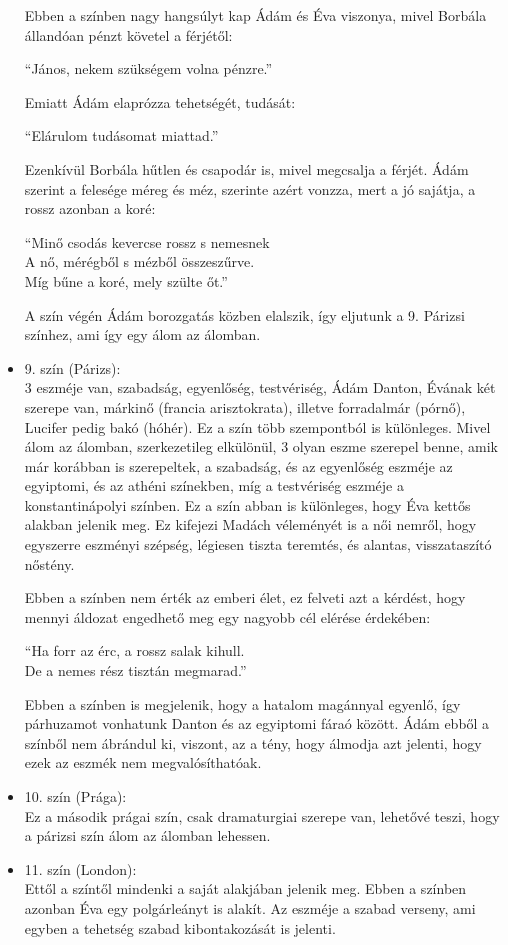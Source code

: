 \documentclass[]{article}
\begin{document}
\begin{itemize}
 			Ebben a színben nagy hangsúlyt kap Ádám és Éva viszonya, mivel Borbála állandóan pénzt követel a férjétől:
 			\begin{displayquote}
 				\enquote{János, nekem szükségem volna pénzre.}
 			\end{displayquote}
 			Emiatt Ádám elaprózza tehetségét, tudását:
 			\begin{displayquote}
 				\enquote{Elárulom tudásomat miattad.}
 			\end{displayquote}
 			Ezenkívül Borbála hűtlen és csapodár is, mivel megcsalja a férjét. Ádám szerint a felesége méreg és méz, szerinte azért vonzza, mert a jó sajátja, a rossz azonban a koré:
 			\begin{displayquote}
 				\enquote{Minő csodás kevercse rossz s nemesnek\\
 				A nő, mérégből s mézből összeszűrve.\\
 				Míg bűne a koré, mely szülte őt.}
 			\end{displayquote}
 			A szín végén Ádám borozgatás közben elalszik, így eljutunk a 9. Párizsi színhez, ami így egy álom az álomban.
		\item 9. szín (Párizs):\\
			3 eszméje van, szabadság, egyenlőség, testvériség, Ádám Danton, Évának két szerepe van, márkinő (francia arisztokrata), illetve forradalmár (pórnő), Lucifer pedig bakó (hóhér). Ez a szín több szempontból is különleges. Mivel álom az álomban, szerkezetileg elkülönül, 3 olyan eszme szerepel benne, amik már korábban is szerepeltek, a szabadság, és az egyenlőség eszméje az egyiptomi, és az athéni színekben, míg a testvériség eszméje a konstantinápolyi színben. Ez a szín abban is különleges, hogy Éva kettős alakban jelenik meg. Ez kifejezi Madách véleményét is a női nemről, hogy egyszerre eszményi szépség, légiesen tiszta teremtés, és alantas, visszataszító nőstény.
			
			Ebben a színben nem érték az emberi élet, ez felveti azt a kérdést, hogy mennyi áldozat engedhető meg egy nagyobb cél elérése érdekében:
			\begin{displayquote}
				\enquote{Ha forr az érc, a rossz salak kihull.\\
				De a nemes rész tisztán megmarad.}
			\end{displayquote}
			Ebben a színben is megjelenik, hogy a hatalom magánnyal egyenlő, így párhuzamot vonhatunk Danton és az egyiptomi fáraó között. Ádám ebből a színből nem ábrándul ki, viszont, az a tény, hogy álmodja azt jelenti, hogy ezek az eszmék nem megvalósíthatóak.
		\item 10. szín (Prága):\\
			Ez a második prágai szín, csak dramaturgiai szerepe van, lehetővé teszi, hogy a párizsi szín álom az álomban lehessen.
		\item 11. szín (London):\\
			Ettől a színtől mindenki a saját alakjában jelenik meg. Ebben a színben azonban Éva egy polgárleányt is alakít. Az eszméje a szabad verseny, ami egyben a tehetség szabad kibontakozását is jelenti.
			

\end{itemize}
\end{document}
